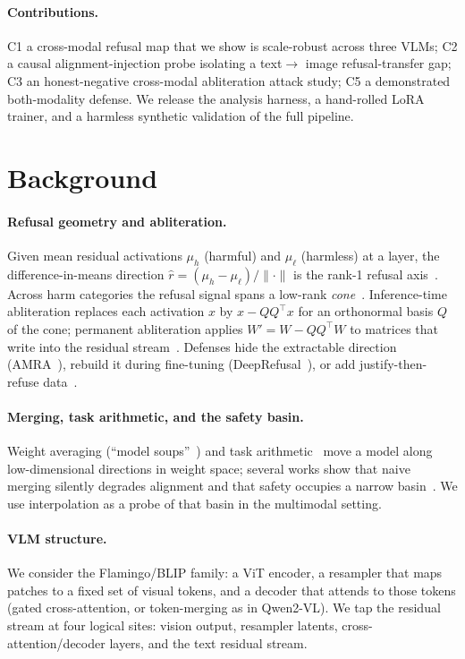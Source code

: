 \documentclass[11pt]{article}
\begin{document}
\paragraph{Contributions.} C1 a cross-modal refusal map that we show is scale-robust
across three VLMs; C2 a causal alignment-injection probe isolating a text$\rightarrow$
image refusal-transfer gap; C3 an honest-negative cross-modal abliteration attack
study; C5 a demonstrated both-modality defense. We release the analysis harness, a
hand-rolled LoRA trainer, and a harmless synthetic validation of the full pipeline.

\section{Background}
\paragraph{Refusal geometry and abliteration.}
Given mean residual activations $\mu_h$ (harmful) and $\mu_\ell$ (harmless) at a
layer, the difference-in-means direction $\hat r = (\mu_h-\mu_\ell)/\lVert\cdot\rVert$
is the rank-1 refusal axis~\cite{arditi2024refusal}. Across harm categories the
refusal signal spans a low-rank \emph{cone}~\cite{wollschlager2025cones,rfmagop2026}.
Inference-time abliteration replaces each activation $x$ by
$x - QQ^\top x$ for an orthonormal basis $Q$ of the cone; permanent abliteration
applies $W' = W - QQ^\top W$ to matrices that write into the residual
stream~\cite{gabliteration2025}. Defenses hide the extractable direction
(AMRA~\cite{amra2026}), rebuild it during fine-tuning
(DeepRefusal~\cite{deeprefusal2025}), or add justify-then-refuse
data~\cite{extendedrefusal2025}.

\paragraph{Merging, task arithmetic, and the safety basin.}
Weight averaging (``model soups''~\cite{wortsman2022soup}) and task
arithmetic~\cite{ilharco2023taskarithmetic} move a model along low-dimensional
directions in weight space; several works show that naive merging silently degrades
alignment and that safety occupies a narrow
basin~\cite{ledmerging2025,safetydrift2026}. We use interpolation as a probe of that
basin in the multimodal setting.

\paragraph{VLM structure.}
We consider the Flamingo/BLIP family: a ViT encoder, a resampler that maps patches
to a fixed set of visual tokens, and a decoder that attends to those tokens (gated
cross-attention, or token-merging as in Qwen2-VL). We tap the residual stream at
four logical sites: vision output, resampler latents, cross-attention/decoder
layers, and the text residual stream.
\end{document}
